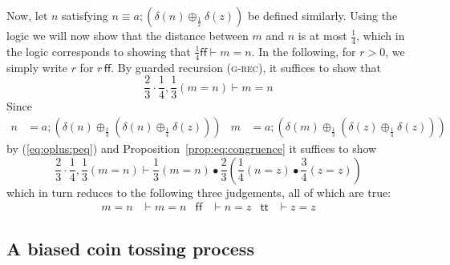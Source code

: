 \documentclass[a4paper,UKenglish,cleveref, autoref, thm-restate]{lipics-v2021}
\newcommand{\giorgio}[1]{{\color{red}\textbf{GB:}~#1}}  %
\newcommand{\ts}{\vdash}
\newcommand{\true}{\mathsf{tt}}
\newcommand{\false}{\mathsf{ff}}
\newcommand{\ltensor}{*}
\renewcommand{\ltensor}{\bullet}
\newcommand{\proc}[2]{#1 \cdot #2}
\renewcommand{\proc}[2]{#1 ; #2}
\newcommand{\peq}{=}
\newcommand{\jeq}{\equiv}
\begin{document}
Now, let $n$ satisfying $n \jeq \proc a{(\delta(n) \oplus_{\frac12} \delta(z))}$ be defined similarly. Using the logic we will now show that
the distance between $m$ and $n$ is at most $\frac14$, which in the logic corresponds to showing that $\frac14\false \vdash m\peq n$. 
In the following, for $r > 0$, we simply write $r$ for $r \,\false$. 
By guarded recursion (\textsc{g-rec}), it suffices to show that
\[
 \frac23\cdot \frac14, \frac13(m\peq n) \ts m\peq n
\]
Since 
\begin{align*}
 n & \peq \proc a(\delta(n) \oplus_{\frac13}(\delta(n) \oplus_{\frac14}\delta(z))) & 
 m & \peq \proc a{(\delta(m) \oplus_{\frac13}(\delta(z) \oplus_{\frac14}\delta(z)))} 
\end{align*}
by (\ref{eq:oplus:peq}) and Proposition~\ref{prop:eq:congruence} it suffices to show %
\[
  \frac23\cdot \frac14, \frac13(m\peq n) \ts \frac13(m\peq n) \ltensor \frac23\left( \frac14(n \peq z) \ltensor \frac34(z \peq z)\right)
\]
which in turn reduces to the following three judgements, all of which are true:
\begin{align*} 
 m \peq n & \ts m \peq n &
 \false & \ts n \peq z &
 \true & \ts z \peq z
\end{align*}

\subsection{A biased coin tossing process}
\label{sec:c:markov}
\end{document}
